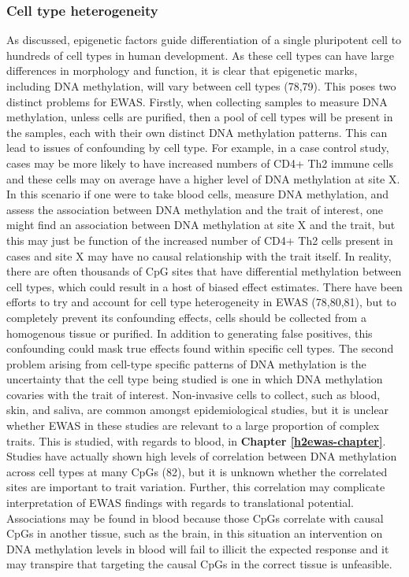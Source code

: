\documentclass[11pt,oneside]{bristolthesis}
\begin{document}
\hypertarget{cell-type-heterogeneity}{%
\subsubsection{Cell type heterogeneity}\label{cell-type-heterogeneity}}

As discussed, epigenetic factors guide differentiation of a single pluripotent cell to hundreds of cell types in human development. As these cell types can have large differences in morphology and function, it is clear that epigenetic marks, including DNA methylation, will vary between cell types (78,79). This poses two distinct problems for EWAS. Firstly, when collecting samples to measure DNA methylation, unless cells are purified, then a pool of cell types will be present in the samples, each with their own distinct DNA methylation patterns. This can lead to issues of confounding by cell type. For example, in a case control study, cases may be more likely to have increased numbers of CD4+ Th2 immune cells and these cells may on average have a higher level of DNA methylation at site X. In this scenario if one were to take blood cells, measure DNA methylation, and assess the association between DNA methylation and the trait of interest, one might find an association between DNA methylation at site X and the trait, but this may just be function of the increased number of CD4+ Th2 cells present in cases and site X may have no causal relationship with the trait itself. In reality, there are often thousands of CpG sites that have differential methylation between cell types, which could result in a host of biased effect estimates. There have been efforts to try and account for cell type heterogeneity in EWAS (78,80,81), but to completely prevent its confounding effects, cells should be collected from a homogenous tissue or purified. In addition to generating false positives, this confounding could mask true effects found within specific cell types. The second problem arising from cell-type specific patterns of DNA methylation is the uncertainty that the cell type being studied is one in which DNA methylation covaries with the trait of interest. Non-invasive cells to collect, such as blood, skin, and saliva, are common amongst epidemiological studies, but it is unclear whether EWAS in these studies are relevant to a large proportion of complex traits. This is studied, with regards to blood, in \textbf{Chapter \ref{h2ewas-chapter}}. Studies have actually shown high levels of correlation between DNA methylation across cell types at many CpGs (82), but it is unknown whether the correlated sites are important to trait variation. Further, this correlation may complicate interpretation of EWAS findings with regards to translational potential. Associations may be found in blood because those CpGs correlate with causal CpGs in another tissue, such as the brain, in this situation an intervention on DNA methylation levels in blood will fail to illicit the expected response and it may transpire that targeting the causal CpGs in the correct tissue is unfeasible.
\end{document}
